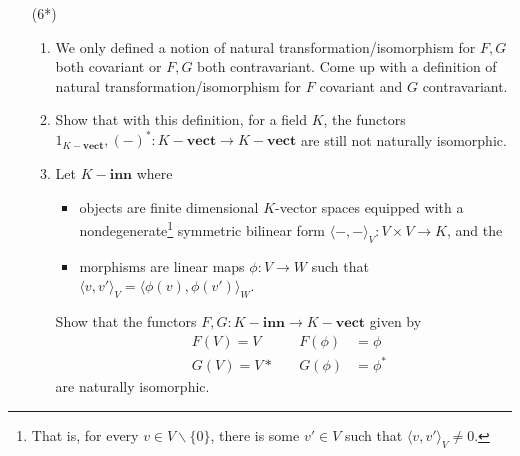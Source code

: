 \documentclass{amsart}[12pt]
\numberwithin{equation}{section}
\theoremstyle{plain} %
\theoremstyle{definition}
\theoremstyle{remark}
\newcommand{\Mod}[1]{#1-\mathbf{Mod}}
\newcommand{\vs}[1]{#1-\mathbf{vect}}
\begin{document}
\begin{enumerate}
 Let $R$ be a commutative ring. A subset $S$ of $R$ is \emph{multiplicatively closed} if $1 \in S$ and $s,t \in S \Rightarrow st \in S$. Define a new ring $S^{-1}R$ as follows:
\[S^{-1}R =\left \{\frac{r}{s} \mid  r \in R, s \in S \right \}/\sim\]
where $\sim$ is the equivalence relation  $\frac{r}{s} \sim \frac{r'}{s'}$ if and only if $t(rs' - r's) = 0$ for some $t \in S$.
This\footnote{This generalizes the construction of the fraction field of a domain $R$, where $S=R\smallsetminus \{0\}$ gives $S^{-1}R={\rm Frac}(R)$.} set is a ring (a fact you need not check) with respect to the operations
\[
\frac{r}{s}+\frac{r'}{s'}=\frac{rs'+r's}{ss'} \qquad
\frac{r}{s}\cdot\frac{r'}{s'}=\frac{rr'}{ss'}.
\]
For an $R$-module $M$ define  
\[S^{-1}M =\left \{\frac{m}{s} \mid  m \in M, s \in S \right \}/\sim\]
where $\sim$ is the equivalence relation  $\frac{m}{s} \sim \frac{m'}{s'}$ if and only if $t(ms' - m's) = 0$ for some $t \in S$.
Then $S^{-1}M$ is an $S^{-1}R$-module (a fact you need not check) via the operations
\[
\frac{m}{s}+\frac{m'}{s'}=\frac{ms'+m's}{ss'} \qquad
\frac{r}{s}\cdot\frac{m}{s'}=\frac{rm}{ss'}.
\]
\begin{enumerate}
\item Show that there is a functor $S^{-1}:\Mod{R}\to \Mod{{S^{-1}R}}$ that on objects maps $M\mapsto S^{-1}M$ and on morphisms maps $f\mapsto S^{-1}f$ where $(S^{-1}f)(\frac{m}{s})=\frac{f(m)}{s}$.
\item Prove that this functor is exact.
\end{enumerate}

\


\item[(6*)]
\begin{enumerate}
\item We only defined a notion of natural transformation/isomorphism for $F,G$ both covariant or $F,G$ both contravariant. Come up with a definition of natural transformation/isomorphism for $F$ covariant and $G$ contravariant.
\item Show that with this definition, for a field $K$, the functors $1_{\vs{K}},(-)^*:\vs{K}\to \vs{K}$ are still not naturally isomorphic.
\item Let $K-\mathbf{inn}$ where 
\begin{itemize}
\item objects are finite dimensional $K$-vector spaces equipped with a nondegenerate\footnote{That is, for every $v\in V\smallsetminus\{0\}$, there is some $v'\in V$ such that $\langle v, v' \rangle_V\neq 0$.} symmetric bilinear form $\langle - , - \rangle_V: V\times V \to K$, and the 
\item morphisms are linear maps $\phi:V\to W$ such that $\langle v, v' \rangle_V = \langle \phi(v) , \phi(v')\rangle_W$.
\end{itemize}
 Show that the functors $F,G:K-\mathbf{inn}\to \vs{K}$ given by
\[\begin{aligned} &F(V)= V  \quad	&F(\phi)&=\phi \\
&G(V) = V* 	\quad	 &G(\phi)&= \phi^*\end{aligned}\]
 are naturally isomorphic.
\end{enumerate}
\end{enumerate}
\end{document}

